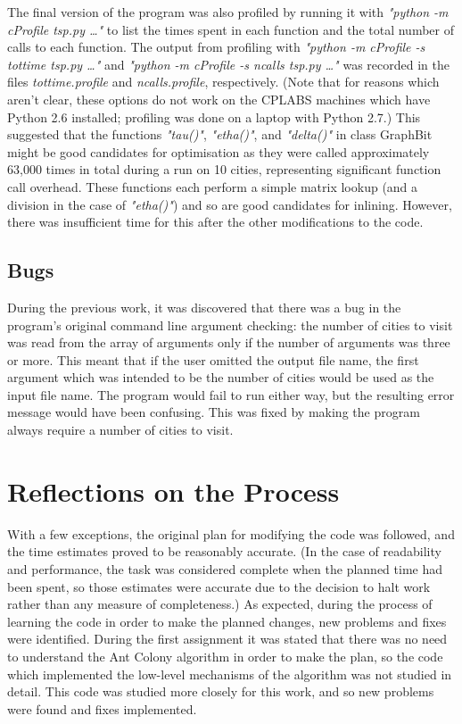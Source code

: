 \documentclass[11pt, oneside]{article}   %
\begin{document}
The final version of the program was also profiled by running it with {\em "python -m cProfile tsp.py …"} to list the times spent in each function and the total number of calls to each function.
The output from profiling with {\em "python -m cProfile -s tottime tsp.py …"} and {\em "python -m cProfile -s ncalls tsp.py …"} was recorded in the files {\em tottime.profile} and {\em ncalls.profile}, respectively.
(Note that for reasons which aren't clear, these options do not work on the CPLABS machines which have Python 2.6 installed; profiling was done on a laptop with Python 2.7.)
This suggested that the functions {\em "tau()"}, {\em "etha()"}, and {\em "delta()"} in class GraphBit might be good candidates for optimisation as they were called approximately 63,000 times in total during a run on 10 cities, representing significant function call overhead.
These functions each perform a simple matrix lookup (and a division in the case of {\em "etha()"}) and so are good candidates for inlining.
However, there was insufficient time for this after the other modifications to the code.

\subsection{Bugs}
During the previous work, it was discovered that there was a bug in the program’s original command line argument checking: the number of cities to visit was read from the array of arguments only if the number of arguments was three or more.  This meant that if the user omitted the output file name, the first argument which was intended to be the number of cities would be used as the input file name.  The program would fail to run either way, but the resulting error message would have been confusing.  This was fixed by making the program always require a number of cities to visit.

\section{Reflections on the Process}
With a few exceptions, the original plan for modifying the code was followed, and the time estimates proved to be reasonably accurate.
(In the case of readability and performance, the task was considered complete when the planned time had been spent, so those estimates were accurate due to the decision to halt work rather than any measure of completeness.)
As expected, during the process of learning the code in order to make the planned changes, new problems and fixes were identified.
During the first assignment it was stated that there was no need to understand the Ant Colony algorithm in order to make the plan, so the code which implemented the low-level mechanisms of the algorithm was not studied in detail.  
This code was studied more closely for this work, and so new problems were found and fixes implemented.
\end{document}
